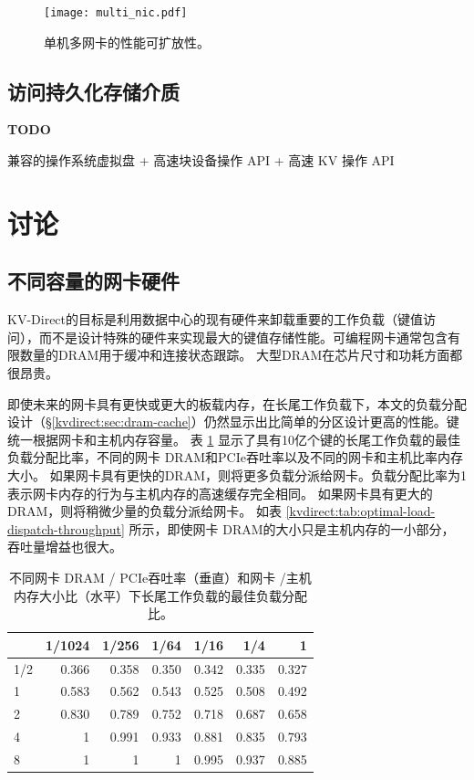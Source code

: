 \begin{figure}[htbp]
	\centering
	\texttt{[image: multi\_nic.pdf]}
	\caption{单机多网卡的性能可扩放性。}
	\label{kvdirect:fig:multiple-nics}
\end{figure}


\subsection{访问持久化存储介质}

\textbf{TODO}

兼容的操作系统虚拟盘 + 高速块设备操作 API + 高速 KV 操作 API


\section{讨论}
\label{kvdirect:sec:discussion}

\subsection{不同容量的网卡硬件}
\label{kvdirect:sec:different-nic}

KV-Direct的目标是利用数据中心的现有硬件来卸载重要的工作负载（键值访问），而不是设计特殊的硬件来实现最大的键值存储性能。可编程网卡通常包含有限数量的DRAM用于缓冲和连接状态跟踪。 大型DRAM在芯片尺寸和功耗方面都很昂贵。

即使未来的网卡具有更快或更大的板载内存，在长尾工作负载下，本文的负载分配设计（\S \ref {kvdirect:sec:dram-cache}）仍然显示出比简单的分区设计更高的性能。键统一根据网卡和主机内存容量。
表 \ref {kvdirect:tab:optimal-load-dispatch} 显示了具有10亿个键的长尾工作负载的最佳负载分配比率，不同的网卡 DRAM和PCIe吞吐率以及不同的网卡和主机比率内存大小。
如果网卡具有更快的DRAM，则将更多负载分派给网卡。负载分配比率为1表示网卡内存的行为与主机内存的高速缓存完全相同。
如果网卡具有更大的DRAM，则将稍微少量的负载分派给网卡。
如表 \ref {kvdirect:tab:optimal-load-dispatch-throughput} 所示，即使网卡 DRAM的大小只是主机内存的一小部分，吞吐量增益也很大。


\begin{table}[htbp]
	\centering
	\caption{不同网卡 DRAM / PCIe吞吐率（垂直）和网卡 /主机内存大小比（水平）下长尾工作负载的最佳负载分配比。}
	\label{kvdirect:tab:optimal-load-dispatch}
	\small
	\begin{tabular}{|l|r|r|r|r|r|r|}
		\hline
		& 1/1024 & 1/256 & 1/64 & 1/16 & 1/4 & 1 \\
		\hline
		1/2  & 0.366 & 0.358 & 0.350 & 0.342 & 0.335 & 0.327 \\
		\hline
		1    & 0.583 & 0.562 & 0.543 & 0.525 & 0.508 & 0.492 \\
		\hline
		2    & 0.830 & 0.789 & 0.752 & 0.718 & 0.687 & 0.658 \\
		\hline
		4    & 1     & 0.991 & 0.933 & 0.881 & 0.835 & 0.793 \\
		\hline
		8    & 1     & 1     & 1     & 0.995 & 0.937 & 0.885 \\
		\hline
	\end{tabular}
\end{table}


